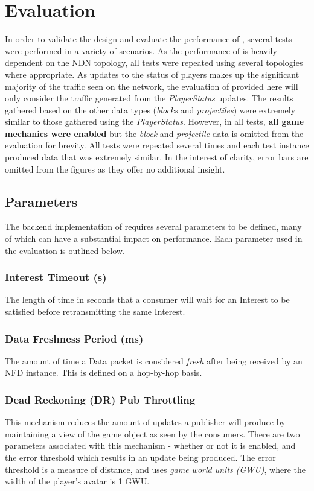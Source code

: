 \section{Evaluation}\label{sec:eval}
In order to validate the design and evaluate the performance of \game{}, several tests were performed in a variety of scenarios. As the performance of \game{} is heavily dependent on the NDN topology, all tests were repeated using several topologies where appropriate. As updates to the status of players makes up the significant majority of the traffic seen on the network, the evaluation of \game{} provided here will only consider the traffic generated from the \textit{PlayerStatus} updates. The results gathered based on the other data types (\textit{blocks} and \textit{projectiles}) were extremely similar to those gathered using the \textit{PlayerStatus}. However, in all tests, \textbf{all game mechanics were enabled} but the \textit{block} and \textit{projectile} data is omitted from the evaluation for brevity.  All tests were repeated several times and each test instance produced data that was extremely similar. In the interest of clarity, error bars are omitted from the figures as they offer no additional insight.


\subsection{Parameters}
The backend implementation of \game{} requires several parameters to be defined, many of which can have a substantial impact on performance. Each parameter used in the evaluation is outlined below.

\subsubsection*{Interest Timeout (s)}
The length of time in seconds that a consumer will wait for an Interest to be satisfied before retransmitting the same Interest.

\subsubsection*{Data Freshness Period (ms)}
The amount of time a Data packet is considered \textit{fresh} after being received by an NFD instance. This is defined on a hop-by-hop basis.

\subsubsection*{Dead Reckoning (DR) Pub Throttling}
This mechanism reduces the amount of updates a publisher will produce by maintaining a view of the game object as seen by the consumers.  There are two parameters associated with this mechanism - whether or not it is enabled, and the error threshold which results in an update being produced. The error threshold is a measure of distance, and uses \textit{game world units (GWU)}, where the width of the player's avatar is 1 GWU.

